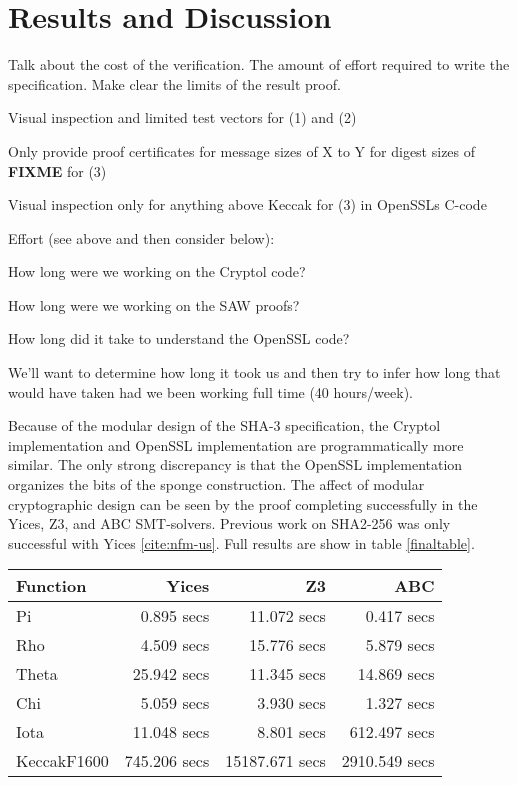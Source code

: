 \section{Results and Discussion}\label{sec:results}

Talk about the cost of the verification. The amount of effort required to write the specification. Make clear the limits of the result proof.

\begin{compactitem}
\item Visual inspection and limited test vectors for (1) and (2)
\item Only provide proof certificates for message sizes of X to Y for digest sizes of \textbf{FIXME} for (3)
\item Visual inspection only for anything above Keccak for (3) in OpenSSLs C-code
\end{compactitem}

Effort (see above and then consider below):
\begin{compactitem}
 \item How long were we working on the Cryptol code?
 \item How long were we working on the SAW proofs?
 \item How long did it take to understand the OpenSSL code?
\end{compactitem}
We'll want to determine how long it took us and then try to infer how long that would have taken had we been working full time (40 hours/week).

Because of the modular design of the SHA-3 specification, the Cryptol implementation and OpenSSL implementation are programmatically more similar. 
The only strong discrepancy is that the OpenSSL implementation organizes the bits of the sponge construction. 
The affect of modular cryptographic design can be seen by the proof completing successfully in the Yices, Z3, and ABC SMT-solvers. 
Previous work on SHA2-256 was only successful with Yices \ref{cite:nfm-us}. Full results are show in table \ref{finaltable}. 

\begin{table*}[b]
\caption{Proof Runtimes for SHA-3 with SMT-solvers}\label{finaltable}
\setlength{\tabcolsep}{13.5pt}
\begin{tabular}{|l|r|r|r|}
\hline
\textbf{Function} & \textbf{Yices} & \textbf{Z3} & \textbf{ABC} \\
\hline
Pi          &   0.895 secs &    11.072 secs &    0.417 secs \\
Rho         &   4.509 secs &    15.776 secs &    5.879 secs \\
Theta       &  25.942 secs &    11.345 secs &   14.869 secs \\
Chi         &   5.059 secs &     3.930 secs &    1.327 secs \\
Iota        &  11.048 secs &     8.801 secs &  612.497 secs \\
KeccakF1600 & 745.206 secs & 15187.671 secs & 2910.549 secs \\
\hline
\end{tabular}
\end{table*}